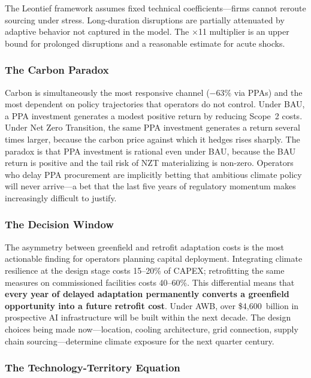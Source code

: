 \begin{twocolbody}
The Leontief framework assumes fixed technical coefficients---firms cannot reroute sourcing under stress. Long-duration disruptions are partially attenuated by adaptive behavior not captured in the model. The $\times$11 multiplier is an upper bound for prolonged disruptions and a reasonable estimate for acute shocks.

\subsubsection*{The Carbon Paradox}

Carbon is simultaneously the most responsive channel ($-$63\% via PPAs) and the most dependent on policy trajectories that operators do not control. Under BAU, a PPA investment generates a modest positive return by reducing Scope~2 costs. Under Net Zero Transition, the same PPA investment generates a return several times larger, because the carbon price against which it hedges rises sharply. The paradox is that PPA investment is rational even under BAU, because the BAU return is positive and the tail risk of NZT materializing is non-zero. Operators who delay PPA procurement are implicitly betting that ambitious climate policy will never arrive---a bet that the last five years of regulatory momentum makes increasingly difficult to justify.

\subsubsection*{The Decision Window}

The asymmetry between greenfield and retrofit adaptation costs is the most actionable finding for operators planning capital deployment. Integrating climate resilience at the design stage costs 15--20\% of CAPEX; retrofitting the same measures on commissioned facilities costs 40--60\%. This differential means that \textbf{every year of delayed adaptation permanently converts a greenfield opportunity into a future retrofit cost}. Under AWB, over \$4{,}600~billion in prospective AI infrastructure will be built within the next decade. The design choices being made now---location, cooling architecture, grid connection, supply chain sourcing---determine climate exposure for the next quarter century.

\subsubsection*{The Technology-Territory Equation}


\end{twocolbody}
